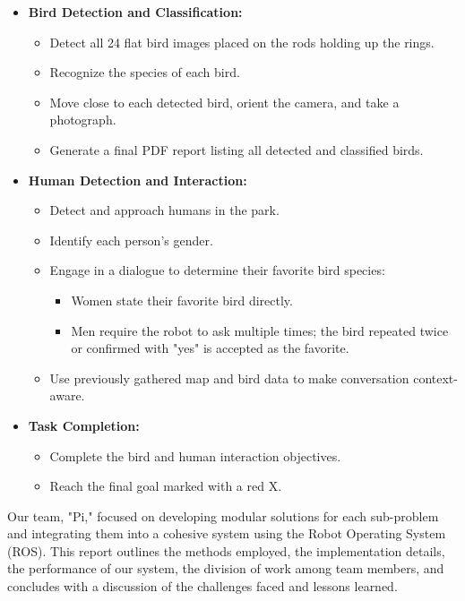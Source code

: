 \documentclass[a4paper]{article}
\begin{document}
\begin{itemize}
    \item \textbf{Bird Detection and Classification:}
    \begin{itemize}
        \item Detect all 24 flat bird images placed on the rods holding up the rings.
        \item Recognize the species of each bird.
        \item Move close to each detected bird, orient the camera, and take a photograph.
        \item Generate a final PDF report listing all detected and classified birds.
    \end{itemize}

    \item \textbf{Human Detection and Interaction:}
    \begin{itemize}
        \item Detect and approach humans in the park.
        \item Identify each person's gender.
        \item Engage in a dialogue to determine their favorite bird species:
        \begin{itemize}
            \item Women state their favorite bird directly.
            \item Men require the robot to ask multiple times; the bird repeated twice or confirmed with "yes" is accepted as the favorite.
        \end{itemize}
        \item Use previously gathered map and bird data to make conversation context-aware.
    \end{itemize}

    \item \textbf{Task Completion:}
    \begin{itemize}
        \item Complete the bird and human interaction objectives.
        \item Reach the final goal marked with a red X.
    \end{itemize}

\end{itemize}




Our team, "Pi," focused on developing modular solutions for each sub-problem and integrating them into a cohesive system using the Robot Operating System (ROS). This report outlines the methods employed, the implementation details, the performance of our system, the division of work among team members, and concludes with a discussion of the challenges faced and lessons learned.
\end{document}
